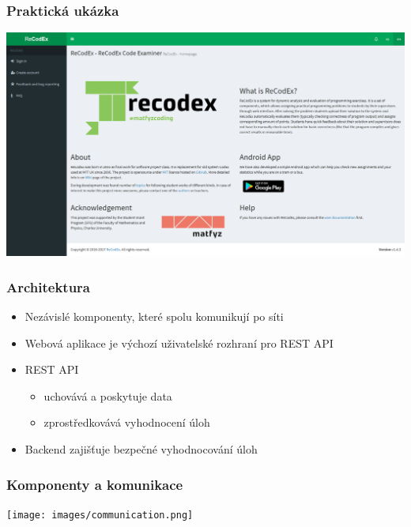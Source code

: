 \documentclass{beamer}
\begin{document}
\begin{frame}
	\frametitle{Praktická ukázka}
	\begin{center}
		\includegraphics[width=1\textwidth]{images/recodex-screen.png}
	\end{center}
\end{frame}

\begin{frame}
	\frametitle{Architektura}
	\begin{itemize}
		\item Nezávislé komponenty, které spolu komunikují po síti
		\item Webová aplikace je výchozí uživatelské rozhraní pro REST API
		\item REST API 
			\begin{itemize}
				\item uchovává a poskytuje data
				\item zprostředkovává vyhodnocení úloh
			\end{itemize}
		\item Backend zajišťuje bezpečné vyhodnocování úloh
	\end{itemize}
\end{frame}

\begin{frame}
	\frametitle{Komponenty a komunikace}
	\begin{center}
		\texttt{[image: images/communication.png]}
	\end{center}
\end{frame}
\end{document}
